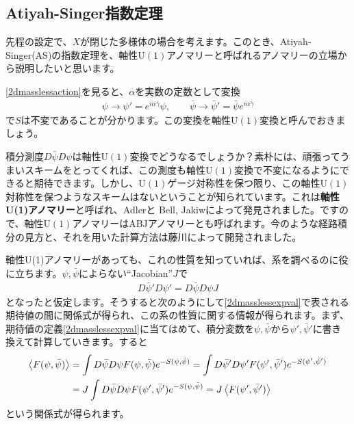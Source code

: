 \documentclass[paper=a4, fontsize=12pt, line_length=16cm, number_of_lines=33,dvipdfmx]{jlreq}
\numberwithin{equation}{section}
\newcommand{\strong}[1]{\textsf{\bfseries #1}}
\newcommand{\psib}{\bar{\psi}}
\newcommand{\gammab}{\bar{\gamma}}
\newcommand{\U}{\mathrm{U}}
\begin{document}
\subsection{Atiyah-Singer指数定理}
先程の設定で、$X$が閉じた多様体の場合を考えます。このとき、Atiyah-Singer(AS)の指数定理を、軸性$\U(1)$アノマリーと呼ばれるアノマリーの立場から説明したいと思います。

\eqref{2dmasslessaction}を見ると、$\alpha$を実数の定数として変換
\begin{align}
  \psi\to \psi'=e^{i\alpha \gammab}\psi,\qquad \psib\to\psib'=\psib e^{i\alpha\gammab}\label{axialu1transf}
\end{align}
で$S$は不変であることが分かります。この変換を軸性$\U(1)$変換と呼んでおきましょう。

積分測度$D\psib D\psi$は軸性$\U(1)$変換でどうなるでしょうか？素朴には、頑張ってうまいスキームをとってくれば、この測度も軸性$\U(1)$変換で不変になるようにできると期待できます。しかし、$\U(1)$ゲージ対称性を保つ限り、この軸性$\U(1)$対称性を保つようなスキームはないということが知られています。これは\strong{軸性U(1)アノマリー}と呼ばれ、Adler\cite{Adler:1969gk}と Bell, Jakiw\cite{Bell:1969ts}によって発見されました。ですので、軸性$\U(1)$アノマリーはABJアノマリーとも呼ばれます。今のような経路積分の見方と、それを用いた計算方法は藤川\cite{Fujikawa:1979ay}によって開発されました。

軸性U(1)アノマリーがあっても、これの性質を知っていれば、系を調べるのに役に立ちます。$\psi,\psib$によらない``Jacobian''$J$で
\begin{align}
  D\psib' D\psi'=D\psib D\psi J\label{Jacobian}
\end{align}
となったと仮定します。そうすると次のようにして\eqref{2dmasslessexpval}で表される期待値の間に関係式が得られ、この系の性質に関する情報が得られます。まず、期待値の定義\eqref{2dmasslessexpval}に当てはめて、積分変数を$\psi,\psib$から$\psi',\psib'$に書き換えて計算していきます。すると
\begin{align}
  \expval{F(\psi,\psib)}
  &=\int D\psib D\psi F(\psi,\psib) e^{-S(\psi,\psib)}
  =\int D\psib' D\psi' F(\psi',\psib') e^{-S(\psi',\psib')}\nonumber\\
  &=J\int D\psib D\psi F(\psi',\psib') e^{-S(\psi,\psib)}
  =J\expval{F(\psi',\psib')}
\end{align}
という関係式が得られます。
\end{document}
